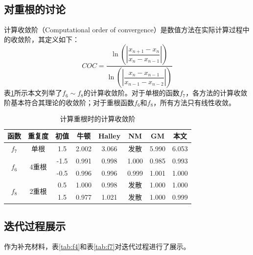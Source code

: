 \subsection{对重根的讨论}

计算收敛阶（Computational order of convergence）\cite{cordero2007variants}是数值方法在实际计算过程中的收敛阶，其定义如下：
\begin{equation}
    COC = \dfrac{\ln\left( \left| \dfrac{x_{n+1} - x_n}{x_n - x_{n-1}} \right| \right)}{\ln\left( \left| \dfrac{x_n - x_{n-1}}{x_{n-1} - x_{n-2}} \right| \right)}
\end{equation}
表\ref{tab:coc}所示本文列举了$f_6 \sim f_8$的计算收敛阶。对于单根的函数$f_7$，各方法的计算收敛阶基本符合其理论的收敛阶；对于重根函数$f_6$和$f_8$，所有方法只有线性收敛。

\begin{table}[!htbp]
    \centering
    \caption{计算重根时的计算收敛阶}
    \label{tab:coc}
    \begin{tabular}{cc|c|ccccc}
        \toprule
        函数 & 重复度 & 初值 & 牛顿 & Halley & NM & GM & 本文 \\
        \midrule
        $f_7$ & 单根 & 1.5 & 2.002 & 3.066 & 发散  & 5.990 & 6.053 \\
        \hline
        \multirow{2}{*}{$f_6$} & \multirow{2}{*}{4重根}
        & -1.5 & 0.991 & 0.998 & 1.000  & 0.985 & 0.993 \\
        & & -0.5 & 0.996 & 0.996 & 0.999  & 1.001 & 1.000 \\
        \hline
        \multirow{2}{*}{$f_8$} & \multirow{2}{*}{2重根}
        & 0.5 & 1.000 & 0.998 & 发散  & 1.000 & 1.000 \\
        &  & 1.5 & 0.977 & 1.021 & 发散  & 1.000 & 0.999 \\
        \bottomrule
    \end{tabular}
\end{table}



\subsection{迭代过程展示}

作为补充材料，表\ref{tab:f4}和表\ref{tab:f7}对迭代过程进行了展示。

